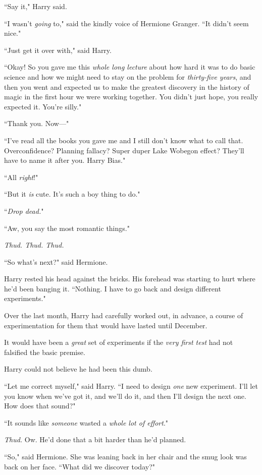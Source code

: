 ``Say it," Harry said.

``I wasn't \emph{going} to," said the kindly voice of Hermione Granger. ``It didn't seem nice."

``Just get it over with," said Harry.

``Okay! So you gave me this \emph{whole long lecture} about how hard it was to do basic science and how we might need to stay on the problem for \emph{thirty-five years}, and then you went and expected us to make the greatest discovery in the history of magic in the first hour we were working together. You didn't just hope, you really expected it. You're silly."

``Thank you. Now—"

``I've read all the books you gave me and I still don't know what to call that. Overconfidence? Planning fallacy? Super duper Lake Wobegon effect? They'll have to name it after you. Harry Bias."

``All \emph{right}!"

``But it \emph{is} cute. It's such a boy thing to do."

``\emph{Drop dead.}"

``Aw, you say the most romantic things."

\emph{Thud. Thud. Thud.}

``So what's next?" said Hermione.

Harry rested his head against the bricks. His forehead was starting to hurt where he'd been banging it. ``Nothing. I have to go back and design different experiments."

Over the last month, Harry had carefully worked out, in advance, a course of experimentation for them that would have lasted until December.

It would have been a \emph{great} set of experiments if the \emph{very first test} had not falsified the basic premise.

Harry could not believe he had been this dumb.

``Let me correct myself," said Harry. ``I need to design \emph{one} new experiment. I'll let you know when we've got it, and we'll do it, and then I'll design the next one. How does that sound?"

``It sounds like \emph{someone} wasted a \emph{whole lot of effort}."

\emph{Thud.} Ow. He'd done that a bit harder than he'd planned.

``So," said Hermione. She was leaning back in her chair and the smug look was back on her face. ``What did we discover today?"

